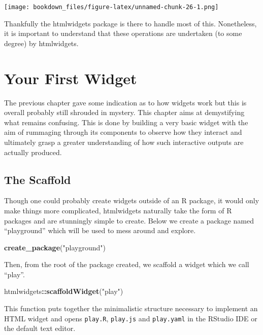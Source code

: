 \documentclass[
]{krantz}
\makeatletter
\newenvironment{Shaded}{\begin{snugshade}}{\end{snugshade}}
\newcommand{\KeywordTok}[1]{\textcolor[rgb]{0.27,0.27,0.27}{\textbf{#1}}}
\newcommand{\NormalTok}[1]{#1}
\newcommand{\OperatorTok}[1]{\textcolor[rgb]{0.43,0.43,0.43}{\textbf{#1}}}
\newcommand{\StringTok}[1]{\textcolor[rgb]{0.5,0.5,0.5}{#1}}
\newenvironment{kframe}{%
\medskip{}
\setlength{\fboxsep}{.8em}
 \def\at@end@of@kframe{}%
 \ifinner\ifhmode%
  \def\at@end@of@kframe{\end{minipage}}%
  \begin{minipage}{\columnwidth}%
 \fi\fi%
 \def\FrameCommand##1{\hskip\@totalleftmargin \hskip-\fboxsep
 \colorbox{shadecolor}{##1}\hskip-\fboxsep
     \hskip-\linewidth \hskip-\@totalleftmargin \hskip\columnwidth}%
 \MakeFramed {\advance\hsize-\width
   \@totalleftmargin\z@ \linewidth\hsize
   \@setminipage}}%
 {\par\unskip\endMakeFramed%
 \at@end@of@kframe}
\renewenvironment{Shaded}{\begin{kframe}}{\end{kframe}}
\makeatother
\begin{document}
\texttt{[image: bookdown\_files/figure-latex/unnamed-chunk-26-1.png]}

Thankfully the htmlwidgets package is there to handle most of this. Nonetheless, it is important to understand that these operations are undertaken (to some degree) by htmlwidgets.

\hypertarget{widgets-first}{%
\chapter{Your First Widget}\label{widgets-first}}

The previous chapter gave some indication as to how widgets work but this is overall probably still shrouded in mystery. This chapter aims at demystifying what remains confusing. This is done by building a very basic widget with the aim of rummaging through its components to observe how they interact and ultimately grasp a greater understanding of how such interactive outputs are actually produced.

\hypertarget{widgets-first-scaffold}{%
\section{The Scaffold}\label{widgets-first-scaffold}}

Though one could probably create widgets outside of an R package, it would only make things more complicated, htmlwidgets naturally take the form of R packages and are stunningly simple to create. Below we create a package named ``playground'' which will be used to mess around and explore.

\begin{Shaded}
\begin{Highlighting}[]
\KeywordTok{create\_package}\NormalTok{(}\StringTok{"playground"}\NormalTok{)}
\end{Highlighting}
\end{Shaded}

Then, from the root of the package created, we scaffold a widget which we call ``play''.

\begin{Shaded}
\begin{Highlighting}[]
\NormalTok{htmlwidgets}\OperatorTok{::}\KeywordTok{scaffoldWidget}\NormalTok{(}\StringTok{"play"}\NormalTok{)}
\end{Highlighting}
\end{Shaded}

This function puts together the minimalistic structure necessary to implement an HTML widget and opens \texttt{play.R}, \texttt{play.js} and \texttt{play.yaml} in the RStudio IDE or the default text editor.
\end{document}
